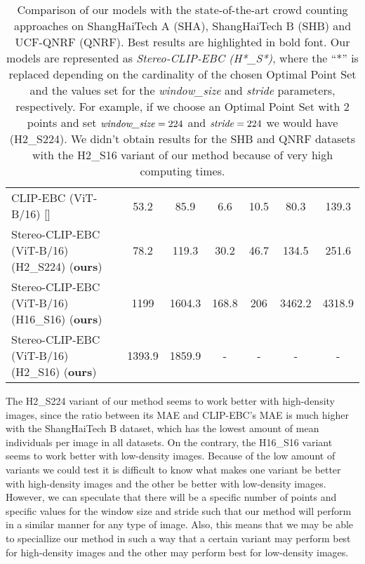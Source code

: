 \begin{table}[h]
\begin{center}
\begin{tabular}{| l | c | c | c | c | c | c | }
            CLIP-EBC (ViT-B/16) [\cite{CLIP}] & 53.2 & 85.9 & 6.6 & 10.5 & 80.3 & 139.3 \\
            Stereo-CLIP-EBC (ViT-B/16) (H2\_S224) (\textbf{ours}) & 78.2 & 119.3 & 30.2 & 46.7 & 134.5 & 251.6 \\
            Stereo-CLIP-EBC (ViT-B/16) (H16\_S16) (\textbf{ours}) & 1199 & 1604.3 & 168.8 & 206 & 3462.2 & 4318.9 \\
            Stereo-CLIP-EBC (ViT-B/16) (H2\_S16) (\textbf{ours}) & 1393.9 & 1859.9 & - & - & - & - \\ \hline
        \end{tabular}
        \caption{Comparison of our models with the state-of-the-art crowd counting approaches on ShangHaiTech A (SHA), ShangHaiTech B (SHB) and UCF-QNRF (QNRF). Best results are highlighted in bold font. Our models are represented as \textit{Stereo-CLIP-EBC (H*\_S*)}, where the ``*'' is replaced depending on the cardinality of the chosen Optimal Point Set and the values set for the \textit{window\_size} and \textit{stride} parameters, respectively. For example, if we choose an Optimal Point Set with 2 points and set $\text{\textit{window\_size}}=224$ and $\text{\textit{stride}}=224$ we would have (H2\_S224). We didn't obtain results for the SHB and QNRF datasets with the H2\_S16 variant of our method because of very high computing times.}
        \label{tabla}
    \end{center}
\end{table}

The H2\_S224 variant of our method seems to work better with high-density images, since the ratio between its MAE and CLIP-EBC's MAE is much higher with the ShangHaiTech B dataset, which has the lowest amount of mean individuals per image in all datasets. On the contrary, the H16\_S16 variant seems to work better with low-density images. Because of the low amount of variants we could test it is difficult to know what makes one variant be better with high-density images and the other be better with low-density images. However, we can speculate that there will be a specific number of points and specific values for the window size and stride such that our method will perform in a similar manner for any type of image. Also, this means that we may be able to speciallize our method in such a way that a certain variant may perform best for high-density images and the other may perform best for low-density images.\\

